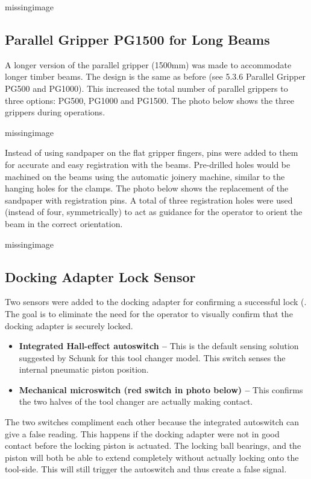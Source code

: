 missingimage

\subsection{Parallel Gripper PG1500 for Long Beams}
\label{subsection:exploration-4-parallel-gripper-pg1500-for-long-beams}

A longer version of the parallel gripper (1500mm) was made to accommodate longer timber beams. The design is the same as before (see 5.3.6 Parallel Gripper PG500 and PG1000). This increased the total number of parallel grippers to three options: PG500, PG1000 and PG1500. The photo below shows the three grippers during operations.

missingimage

Instead of using sandpaper on the flat gripper fingers, pins were added to them for accurate and easy registration with the beams. Pre-drilled holes would be machined on the beams using the automatic joinery machine, similar to the hanging holes for the clamps. The photo below shows the replacement of the sandpaper with registration pins. A total of three registration holes were used (instead of four, symmetrically) to act as guidance for the operator to orient the beam in the correct orientation. 

missingimage

\subsection{Docking Adapter Lock Sensor}
\label{subsection:exploration-4-docking-adapter-lock-sensor}

Two sensors were added to the docking adapter for confirming a successful lock (. The goal is to eliminate the need for the operator to visually confirm that the docking adapter is securely locked.

\begin{itemize}
    \item \textbf{Integrated Hall-effect autoswitch --} This is the default sensing solution suggested by Schunk for this tool changer model. This switch senses the internal pneumatic piston position.
    \item \textbf{Mechanical microswitch (red switch in photo below) --} This confirms the two halves of the tool changer are actually making contact.
\end{itemize}

The two switches compliment each other because the integrated autoswitch can give a false reading. This happens if the docking adapter were not in good contact before the locking piston is actuated. The locking ball bearings, and the piston will both be able to extend completely without actually locking onto the tool-side. This will still trigger the autoswitch and thus create a false signal. 

